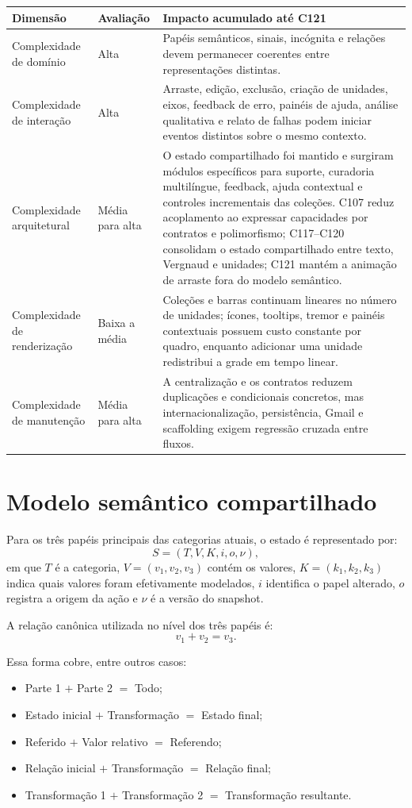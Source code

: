 \documentclass[12pt,a4paper]{article}
\begin{document}
\begin{tabularx}{\textwidth}{p{3.8cm}p{2.8cm}X}
\toprule
\textbf{Dimensão} & \textbf{Avaliação} & \textbf{Impacto acumulado até C121}\\
\midrule
Complexidade de domínio & Alta & Papéis semânticos, sinais, incógnita e relações devem permanecer coerentes entre representações distintas.\\
Complexidade de interação & Alta & Arraste, edição, exclusão, criação de unidades, eixos, feedback de erro, painéis de ajuda, análise qualitativa e relato de falhas podem iniciar eventos distintos sobre o mesmo contexto.\\
Complexidade arquitetural & Média para alta & O estado compartilhado foi mantido e surgiram módulos específicos para suporte, curadoria multilíngue, feedback, ajuda contextual e controles incrementais das coleções. C107 reduz acoplamento ao expressar capacidades por contratos e polimorfismo; C117--C120 consolidam o estado compartilhado entre texto, Vergnaud e unidades; C121 mantém a animação de arraste fora do modelo semântico.\\
Complexidade de renderização & Baixa a média & Coleções e barras continuam lineares no número de unidades; ícones, tooltips, tremor e painéis contextuais possuem custo constante por quadro, enquanto adicionar uma unidade redistribui a grade em tempo linear.\\
Complexidade de manutenção & Média para alta & A centralização e os contratos reduzem duplicações e condicionais concretos, mas internacionalização, persistência, Gmail e scaffolding exigem regressão cruzada entre fluxos.\\
\bottomrule
\end{tabularx}

\section{Modelo semântico compartilhado}

Para os três papéis principais das categorias atuais, o estado é representado por:
\[
S = (T, V, K, i, o, \nu),
\]
em que $T$ é a categoria, $V=(v_1,v_2,v_3)$ contém os valores, $K=(k_1,k_2,k_3)$ indica quais valores foram efetivamente modelados, $i$ identifica o papel alterado, $o$ registra a origem da ação e $\nu$ é a versão do snapshot.

A relação canônica utilizada no nível dos três papéis é:
\[
v_1 + v_2 = v_3.
\]

Essa forma cobre, entre outros casos:
\begin{itemize}[noitemsep]
  \item Parte 1 $+$ Parte 2 $=$ Todo;
  \item Estado inicial $+$ Transformação $=$ Estado final;
  \item Referido $+$ Valor relativo $=$ Referendo;
  \item Relação inicial $+$ Transformação $=$ Relação final;
  \item Transformação 1 $+$ Transformação 2 $=$ Transformação resultante.
\end{itemize}
\end{document}
